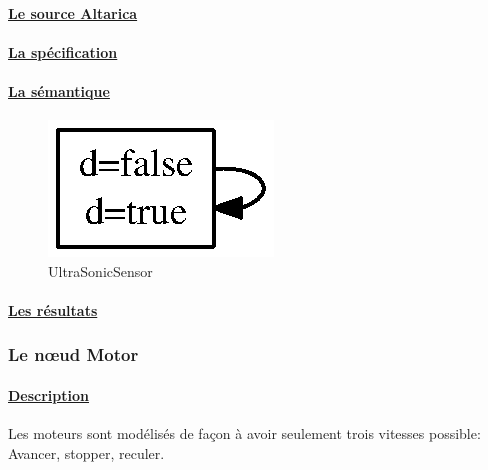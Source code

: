     \paragraph{\underline{Le source Altarica\\}}
    
    
    \paragraph{\underline{La spécification\\}}
    
    
    \paragraph{\underline{La sémantique\\}}
    \begin{figure}[!ht]
     \begin{center}
      \includegraphics{../src/altarica/UltraSonicSensor.eps}
      \caption{UltraSonicSensor}
     \end{center}
    \end{figure}

    \paragraph{\underline{Les résultats\\}}
    
    
   
   \subsubsection{Le n\oe{}ud Motor}
  
    \paragraph{\underline{Description\\}}
    Les moteurs sont modélisés de façon à avoir seulement trois vitesses
    possible: Avancer, stopper, reculer.

